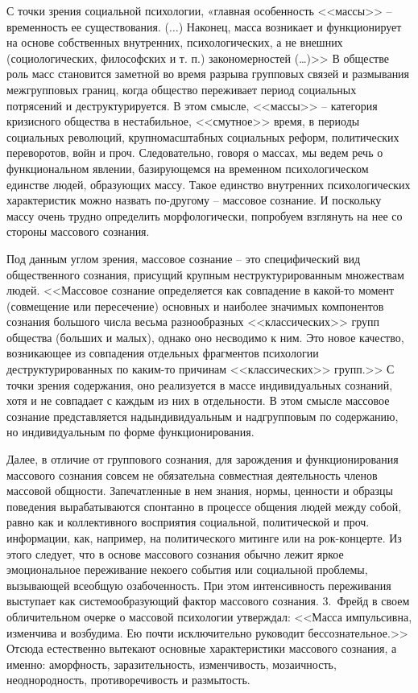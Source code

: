 С точки зрения социальной психологии,  «главная особенность <<массы>> -- временность ее существования. ($\ldots$)
Наконец, масса возникает и функционирует на основе собственных внутренних, психологических,
а не внешних (социологических, философских и т. п.) закономерностей (\ldots)>>\autocite{olshansky}
В обществе роль масс становится заметной во время разрыва групповых связей и размывания
межгрупповых границ, когда общество переживает период социальных потрясений и деструктурируется.
В этом смысле, <<массы>> -- категория кризисного общества в нестабильное, <<смутное>> время, в периоды
социальных революций, крупномасштабных социальных реформ,
политических переворотов, войн и проч. Следовательно, говоря о массах, мы ведем речь о функциональном явлении,
базирующемся на временном психологическом единстве людей, образующих массу. Такое единство внутренних психологических
характеристик можно назвать по-другому -- массовое сознание. И поскольку массу очень трудно определить морфологически,
попробуем взглянуть на нее со стороны массового сознания.

Под данным углом зрения, массовое сознание -- это специфический вид общественного сознания, присущий крупным
неструктурированным множествам людей. <<Массовое сознание определяется как совпадение в какой-то момент
(совмещение или пересечение) основных и наиболее значимых компонентов сознания большого числа весьма
разнообразных <<классических>> групп общества (больших и малых), однако оно несводимо к ним. Это новое качество,
возникающее из совпадения отдельных фрагментов психологии деструктурированных по каким-то причинам <<классических>>
групп.>>\autocite{olshansky} С точки зрения содержания, оно реализуется в массе индивидуальных сознаний,
хотя и не совпадает с каждым из них в отдельности. В этом смысле массовое сознание представляется надындивидуальным
и надгрупповым по содержанию, но индивидуальным по форме функционирования.

Далее, в отличие от группового сознания, для зарождения и функционирования массового сознания совсем не
обязательна совместная деятельность членов массовой общности. Запечатленные в нем знания, нормы, ценности и
образцы поведения вырабатываются спонтанно в процессе общения людей между собой, равно как и коллективного
восприятия социальной, политической и проч. информации, как, например, на политического митинге или на рок-концерте.
Из этого следует, что в основе массового сознания обычно лежит яркое эмоциональное переживание некоего
события или социальной проблемы, вызывающей всеобщую озабоченность. При этом интенсивность переживания
выступает как системообразующий фактор массового сознания. 3.~Фрейд в своем обличительном очерке о массовой
психологии утверждал: <<Масса импульсивна, изменчива и возбудима. Ею почти исключительно руководит
бессознательное.>>\autocite{freid_mass} Отсюда естественно вытекают основные характеристики массового сознания,
а именно: аморфность, заразительность, изменчивость, мозаичность, неоднородность, противоречивость и
размытость.\autocite{ashin}\autocite{flier}\autocite{prokudin}\autocite{heveshi}\autocite{hevishi2001tolpa}\autocite{streltsov1970}\autocite{dodonov1999}

